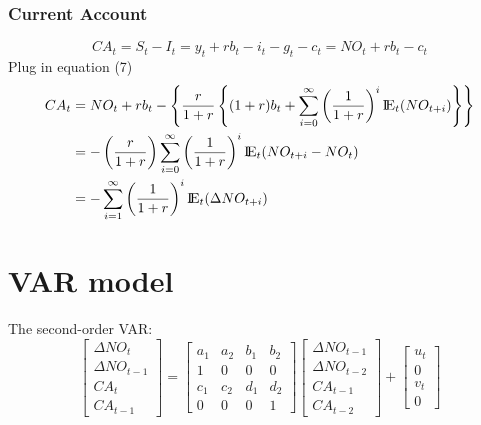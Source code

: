 \documentclass[12pt]{article}
\begin{document}
\subsubsection{Current Account}

\begin{equation}
CA_{t} = S_{t} - I_{t} = y_{t} + r b_{t}  - i_{t} - g_{t} - c_{t} = NO_{t} + r b_{t} - 
c_{t}
\end{equation}
Plug in equation (7)
\begin{align*}
CA_{t} &= NO_{t} + r b_{t} - \left\{ 
\frac{r}{1 + r}\left\{ 
(1 + r)b_{t} + \sum\limits_{i = 0} ^\infty \left( \frac{1}{1 + r} \right)^{i}
{\rm I\!{E}}_{t}(NO_{t + i})
\right\} 
\right\} \\
 &=  - \left( \frac{r}{1 + r} \right) \sum\limits_{i = 0} ^\infty 
 \left( \frac{1}{1 + r} \right) ^{i}{\rm I\!{E}}_{t}(NO_{t + i} - NO_{t})\\
 &=  - \sum\limits_{i = 1} ^\infty \left( \frac{1}{1 + r} \right)^{i}{\rm I\!{E}}_{t}
 (\Delta NO_{t + i}) 
\end{align*}




\section{VAR model}




The second-order VAR:
\begin{equation}
\begin{bmatrix}
\Delta NO_{t}\\
\Delta NO_{t - 1}\\
CA_{t}\\
CA_{t - 1}
\end{bmatrix}
=
\begin{bmatrix}
a_1 & a_2 & b_1 & b_2\\
1 & 0 & 0 & 0\\
c_1 & c_2 & d_1 & d_2\\
0 & 0 & 0 & 1
\end{bmatrix}
\begin{bmatrix}
\Delta NO_{t - 1}\\
\Delta NO_{t - 2}\\
CA_{t - 1}\\
CA_{t - 2}
\end{bmatrix}
 + 
\begin{bmatrix}
u_{t}\\
0\\
v_{t}\\
0
\end{bmatrix}
\end{equation}
\end{document}
